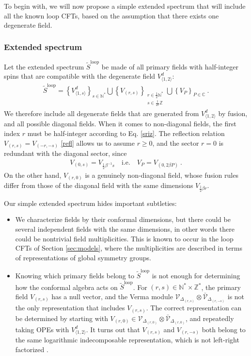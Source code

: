 \documentclass[12pt, a4paper]{article}
\theoremstyle{break}
\begin{document}
To begin with, we will now propose a simple extended spectrum that will include all the known loop CFTs, based on the assumption that there exists one degenerate field. 

\subsubsection{Extended spectrum}

Let the extended spectrum $\widetilde{S}^\text{loop}$ be made of all primary fields with half-integer spins that are compatible with the degenerate field $V^d_{\langle 1,2\rangle}$:
\begin{align}
 \boxed{\widetilde{S}^\text{loop} = \left\{V^d_{\langle 1,s\rangle}\right\}_{s\in\mathbb{N}^*}  \bigcup \left\{V_{(r,s)}\right\}_{\substack{r\in \frac12\mathbb{N}^*\\ s\in\frac{1}{2r}\mathbb{Z}}}\bigcup \left\{ V_P\right\}_{P\in\mathbb{C}} } \ .
 \label{sloop}
\end{align}
We therefore include all degenerate fields that are generated from $V^d_{\langle 1,2\rangle}$ by fusion, and all possible diagonal fields. When it comes to non-diagonal fields, the first index $r$ must be half-integer according to Eq. \eqref{sriz}. The reflection relation $V_{(r,s)}=V_{(-r,-s)}$ \eqref{refl} allows us to assume $r\geq 0$, and the sector $r=0$ is redundant with the diagonal sector, since 
\begin{align}
 V_{(0,s)} = V_{\frac12\beta^{-1}s}  \quad \text{i.e.} \quad V_P = V_{(0,2\beta P)} \ .
 \label{sP}
\end{align}
On the other hand, $V_{(r,0)}$ is a genuinely non-diagonal field, whose fusion rules differ from those of the diagonal field with the same dimensions $V_{\frac12\beta r}$. 

Our simple extended spectrum hides important subtleties: 
\begin{itemize}
 \item We characterize fields by their conformal dimensions, but there could be several independent fields with the same dimensions, in other words there could be nontrivial field multiplicities. This is known to occur in the loop CFTs of Section \ref{sec:models}, where the multiplicities are described in terms of representations of global symmetry groups.  
 \item Knowing which primary fields belong to $\widetilde{S}^\text{loop}$ is not enough for determining how the conformal algebra acts on $\widetilde{S}^\text{loop}$. For $(r,s)\in \mathbb{N}^*\times \mathbb{Z}^*$, the primary field $V_{(r,s)}$ has a null vector, and the Verma module $\mathcal{V}_{\Delta_{(r,s)}}\otimes\bar{\mathcal{V}}_{\Delta_{(r,-s)}}$ is not the only representation that includes $V_{(r,s)}$. The correct representation can be determined by starting with $V_{(r,0)}\in \mathcal{V}_{\Delta_{(r,0)}}\otimes\bar{\mathcal{V}}_{\Delta_{(r,0)}}$, and repeatedly taking OPEs with $V^d_{\langle 1,2\rangle}$. It turns out that $V_{(r,s)}$ and $V_{(r,-s)}$ both belong to the same logarithmic indecomposable representation, which is not left-right factorized  \cite{nr20}. 
\end{itemize}
\end{document}
